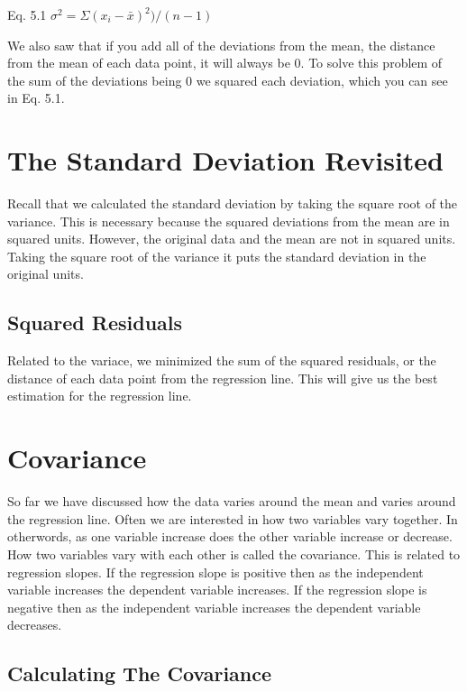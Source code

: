 \documentclass[]{book}
\theoremstyle{definition}
\theoremstyle{definition}
\theoremstyle{definition}
\theoremstyle{remark}
\begin{document}
Eq. 5.1 \(\sigma^2 = \Sigma(x_{i} - \bar{x})^2)/(n-1)\)

We also saw that if you add all of the deviations from the mean, the
distance from the mean of each data point, it will always be \(0\). To
solve this problem of the sum of the deviations being \(0\) we squared
each deviation, which you can see in Eq. 5.1.

\hypertarget{the-standard-deviation-revisited}{%
\section{The Standard Deviation
Revisited}\label{the-standard-deviation-revisited}}

Recall that we calculated the standard deviation by taking the square
root of the variance. This is necessary because the squared deviations
from the mean are in squared units. However, the original data and the
mean are not in squared units. Taking the square root of the variance it
puts the standard deviation in the original units.

\hypertarget{squared-residuals}{%
\subsection{Squared Residuals}\label{squared-residuals}}

Related to the variace, we minimized the sum of the squared residuals,
or the distance of each data point from the regression line. This will
give us the best estimation for the regression line.

\hypertarget{covariance}{%
\section{Covariance}\label{covariance}}

So far we have discussed how the data varies around the mean and varies
around the regression line. Often we are interested in how two variables
vary together. In otherwords, as one variable increase does the other
variable increase or decrease. How two variables vary with each other is
called the covariance. This is related to regression slopes. If the
regression slope is positive then as the independent variable increases
the dependent variable increases. If the regression slope is negative
then as the independent variable increases the dependent variable
decreases.

\hypertarget{calculating-the-covariance}{%
\subsection{Calculating The
Covariance}\label{calculating-the-covariance}}
\end{document}
